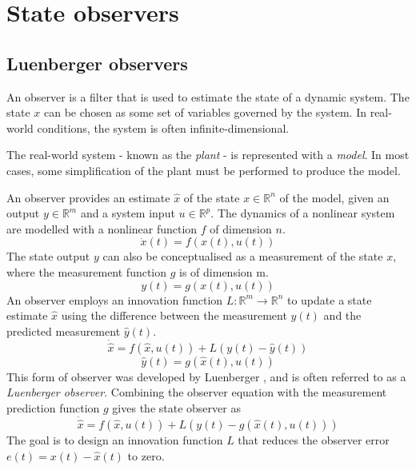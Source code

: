 \section{State observers} \label{sec:observerequations}
\subsection{Luenberger observers}
An observer is a filter that is used to estimate the state of a dynamic system. The state $x$ can be chosen as some set of variables governed by the system. In real-world conditions, the system is often infinite-dimensional.

The real-world system - known as the \textit{plant} - is represented with a \textit{model}. In most cases, some simplification of the plant must be performed to produce the model.

An observer provides an estimate $\hat{x}$ of the state $x \in \mathbb{R}^n$ of the model, given an output $y \in \mathbb{R}^m$ and a system input $u \in \mathbb{R}^p$. The dynamics of a nonlinear system are modelled with a nonlinear function $f$ of dimension $n$.
\begin{equation}
	\dot{x}(t) = f(x(t),u(t))
\end{equation}
The state output $y$ can also be conceptualised as a measurement of the state $x$, where the measurement function $g$ is of dimension m.
\begin{equation}
	y(t) = g(x(t),u(t))
\end{equation}
An observer employs an innovation function $L: \mathbb{R}^m \rightarrow \mathbb{R}^n$ to update a state estimate $\hat{x}$ using the difference between the measurement $y(t)$ and the predicted measurement $\hat{y}(t)$.
\begin{equation} \label{eq:observerfunction}
	\dot{\hat{x}} = f(\hat{x},u(t)) + L(y(t)-\hat{y}(t))
\end{equation}
\begin{equation}
	\hat{y}(t) = g(\hat{x}(t),u(t)) 
\end{equation}
This form of observer was developed by Luenberger \cite{luenberger1966observers}, and is often referred to as a \textit{Luenberger observer}. Combining the observer equation with the measurement prediction function $g$ gives the state observer as
\begin{equation}
	\dot{\hat{x}} = f(\hat{x},u(t)) + L(y(t)-g(\hat{x}(t),u(t)))
\end{equation}
The goal is to design an innovation function $L$ that reduces the observer error $e(t) = x(t) - \hat{x}(t)$ to zero.

